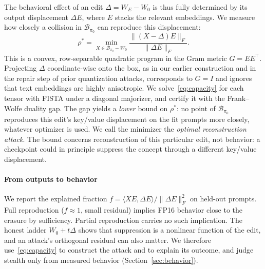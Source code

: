 The behavioral effect of an edit $\Delta=W_E-W_0$ is thus fully determined by its
output displacement $\Delta E$, where $E$ stacks the relevant embeddings. We measure
how closely a collision in $\mathcal{B}_{\pi_0}$ can reproduce this displacement:
\begin{equation}
 \rho^*=\min_{X\in\mathcal{B}_{\pi_0}-W_0}\frac{\|(X-\Delta)E\|_F}{\|\Delta E\|_F}.
 \label{eq:capacity}
\end{equation}
This is a convex, row-separable quadratic program in the Gram metric $G=EE^\top$.
Projecting $\Delta$ coordinate-wise onto the box, as in our earlier construction and
in the repair step of prior quantization attacks, corresponds to $G=I$ and ignores
that text embeddings are highly anisotropic. We solve~\eqref{eq:capacity} for each
tensor with FISTA under a diagonal majorizer, and certify it with the Frank--Wolfe
duality gap. The gap yields a \emph{lower} bound on $\rho^*$: no point of
$\mathcal{B}_{\pi_0}$ reproduces this edit's key/value displacement on the fit prompts
more closely, whatever optimizer is used. We call the minimizer the \emph{optimal
reconstruction attack}. The bound concerns reconstruction of this particular edit, not
behavior: a checkpoint could in principle suppress the concept through a different
key/value displacement.

\paragraph{From outputs to behavior}
We report the explained fraction $f=\langle XE,\Delta E\rangle/\|\Delta E\|_F^2$ on
held-out prompts. Full reproduction ($f\approx1$, small residual) implies FP16
behavior close to the erasure by sufficiency. Partial reproduction carries no such
implication. The honest ladder $W_0+t\Delta$ shows that suppression is a nonlinear
function of the edit, and an attack's orthogonal residual can also matter. We
therefore use~\eqref{eq:capacity} to construct the attack and to explain its outcome,
and judge stealth only from measured behavior (Section~\ref{sec:behavior}).
